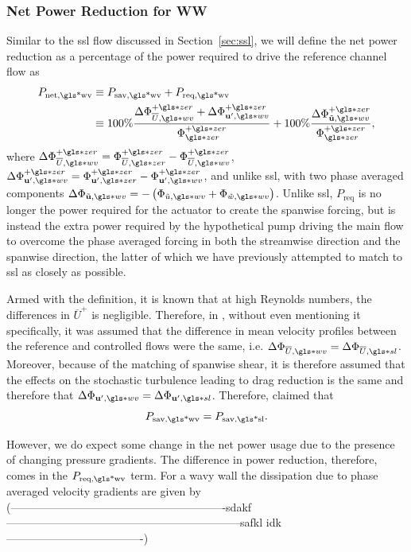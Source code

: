 \subsubsection{Net Power Reduction for WW}
Similar to the  \gls{ssl} flow discussed in Section~\ref{sec:ssl}, we will define the net power reduction as a percentage of the power required to drive the reference channel flow as
\begin{align}
	P_\text{net,\gls*{wv}} &\equiv P_\text{sav,\gls*{wv}} +P_\text{req,\gls*{wv}} \\
			       &\equiv 100\% \frac{\Delta \Phi _{\overline{U},\gls*{wv}}\pz+\Delta \Phi_{\mathbf{u'} ,\gls*{wv}}\pz }{\Phi \zz\pz} +100\% \frac{\Delta \Phi _{\tilde{\mathbf{u} },\gls*{wv}}\pz}{\Phi \zz\pz}
,\end{align}
where $\Delta \Phi _{\overline{U},\gls*{wv}}\pz=\Phi _{\overline{U},\gls*{zer}}\pz-\Phi _{\overline{U},\gls*{wv}}\pz $, $\Delta \Phi_{\mathbf{u'} ,\gls*{wv}}\pz =\Phi_{\mathbf{u'} ,\gls*{zer}}\pz -\Phi_{\mathbf{u'} ,\gls*{wv}}\pz $, and unlike \gls{ssl}, with two phase averaged components $\Delta \Phi _{\tilde{\mathbf{u} },\gls*{wv}}=-\left(\Phi _{\tilde{u},\gls*{wv}}+\Phi _{\tilde{w},\gls*{wv}}\right)$. Unlike \gls{ssl}, $P_\text{req} $ is no longer the power required for the actuator to create the spanwise forcing, but is instead the extra power required by the hypothetical pump driving the main flow to overcome the phase averaged forcing in both the streamwise direction and the spanwise direction, the latter of which we have previously attempted to match to \gls{ssl} as closely as possible.

Armed with the definition, it is known that at high Reynolds numbers, the differences in $\overline{U}^{+}$ is negligible. Therefore, in \textcite{chernyshenko2013}, without even mentioning it specifically, it was assumed that the difference in mean velocity profiles between the reference and controlled flows were the same, i.e. $\Delta \Phi _{\overline{U},\gls*{wv}}=\Delta \Phi _{\overline{U},\gls*{sl}}$. Moreover, because of the matching of spanwise shear, it is therefore assumed that the effects on the stochastic turbulence leading to drag reduction is the same and therefore that $\Delta \Phi _{\mathbf{u'} ,\gls*{wv}}=\Delta \Phi _{\mathbf{u'} ,\gls*{sl}}$. Therefore, \textcite{chernyshenko2013} claimed that
\begin{equation}
	P_\text{sav,\gls*{wv}} = P_\text{sav,\gls*{sl}}  
.\end{equation}

However, we do expect some change in the net power usage due to the presence of changing pressure gradients. The difference in power reduction, therefore, comes in the $P_\text{req,\gls*{wv}} $ term. For a wavy wall the dissipation due to phase averaged velocity gradients are given by (----------------------------------------------------------sdakf ---------------------------------------------------------------safkl idk-------------------------------------)


